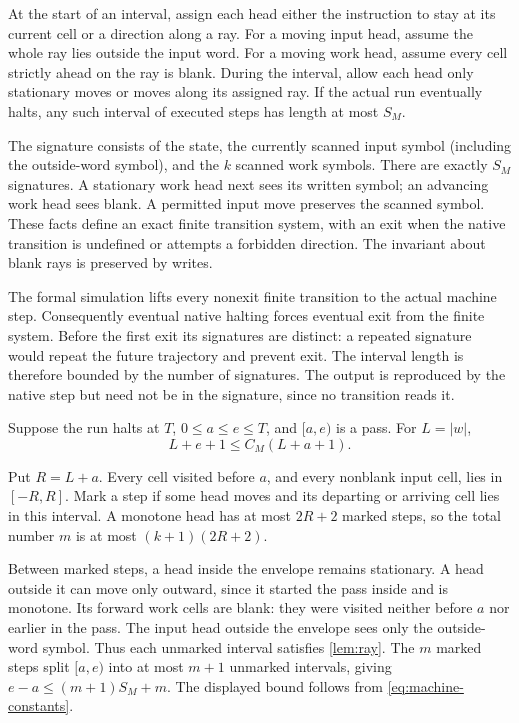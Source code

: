 \begin{lemma}\label{lem:ray}
At the start of an interval, assign each head either the instruction to stay
at its current cell or a direction along a ray. For a moving input head,
assume the whole ray lies outside the input word. For a moving work head,
assume every cell strictly ahead on the ray is blank. During the interval,
allow each head only stationary moves or moves along its assigned ray.
If the actual run eventually halts, any such interval of executed steps has
length at most $S_M$.
\end{lemma}
\begin{outline}
The signature consists of the state, the currently scanned input symbol
(including the outside-word symbol), and the $k$ scanned work symbols.
There are exactly $S_M$ signatures. A stationary work head next sees its
written symbol; an advancing work head sees blank. A permitted input move
preserves the scanned symbol. These facts define an exact finite transition
system, with an exit when the native transition is undefined or attempts a
forbidden direction. The invariant about blank rays is preserved by writes.

The formal simulation lifts every nonexit finite transition to the actual
machine step. Consequently eventual native halting forces eventual exit
from the finite system. Before the first exit its signatures are distinct:
a repeated signature would repeat the future trajectory and prevent exit.
The interval length is therefore bounded by the number of signatures. The
output is reproduced by the native step but need not be in the signature,
since no transition reads it.
\end{outline}

\begin{lemma}\label{lem:envelope}
Suppose the run halts at $T$, $0\le a\le e\le T$, and $[a,e)$ is a pass.
For $L=|w|$,
\[
 L+e+1\le C_M(L+a+1).
\]
\end{lemma}
\begin{outline}
Put $R=L+a$. Every cell visited before $a$, and every nonblank input cell,
lies in $[-R,R]$. Mark a step if some head moves and its departing or
arriving cell lies in this interval. A monotone head has at most $2R+2$
marked steps, so the total number $m$ is at most $(k+1)(2R+2)$.

Between marked steps, a head inside the envelope remains stationary.
A head outside it can move only outward, since it started the pass inside
and is monotone. Its forward work cells are blank: they were visited neither
before $a$ nor earlier in the pass. The input head outside the envelope sees
only the outside-word symbol. Thus each unmarked interval satisfies
\cref{lem:ray}. The $m$ marked steps split $[a,e)$ into at most $m+1$
unmarked intervals, giving $e-a\le(m+1)S_M+m$. The displayed bound follows
from \cref{eq:machine-constants}.
\end{outline}

